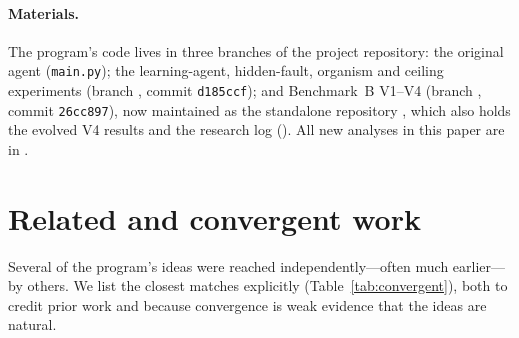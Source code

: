 \documentclass[11pt]{article}
\theoremstyle{remark}
\begin{document}
\paragraph{Materials.} The program's code lives in three branches of the project repository: the original agent
(\texttt{main.py}); the learning-agent, hidden-fault, organism and ceiling experiments (branch
, commit \texttt{d185ccf}); and Benchmark~B V1--V4 (branch
, commit \texttt{26cc897}), now maintained as the standalone repository
, which also holds the evolved V4 results and the research log
(). All new analyses in this paper are in .

\section{Related and convergent work}

Several of the program's ideas were reached independently---often much earlier---by others. We list the closest
matches explicitly (Table~\ref{tab:convergent}), both to credit prior work and because convergence is weak
evidence that the ideas are natural.
\end{document}
